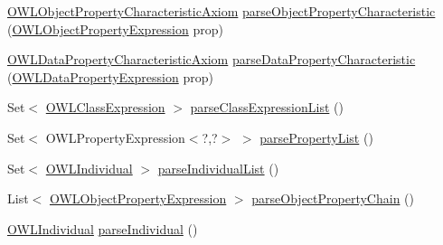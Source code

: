 \begin{DoxyCompactItemize}
\item 
\hyperlink{interfaceorg_1_1semanticweb_1_1owlapi_1_1model_1_1_o_w_l_object_property_characteristic_axiom}{O\-W\-L\-Object\-Property\-Characteristic\-Axiom} \hyperlink{classorg_1_1coode_1_1owlapi_1_1manchesterowlsyntax_1_1_manchester_o_w_l_syntax_editor_parser_aea12f7854e8d085858613f5f21e0d02e}{parse\-Object\-Property\-Characteristic} (\hyperlink{interfaceorg_1_1semanticweb_1_1owlapi_1_1model_1_1_o_w_l_object_property_expression}{O\-W\-L\-Object\-Property\-Expression} prop)
\item 
\hyperlink{interfaceorg_1_1semanticweb_1_1owlapi_1_1model_1_1_o_w_l_data_property_characteristic_axiom}{O\-W\-L\-Data\-Property\-Characteristic\-Axiom} \hyperlink{classorg_1_1coode_1_1owlapi_1_1manchesterowlsyntax_1_1_manchester_o_w_l_syntax_editor_parser_a18fb0d0cf1bfbc177dda26dbafe4a248}{parse\-Data\-Property\-Characteristic} (\hyperlink{interfaceorg_1_1semanticweb_1_1owlapi_1_1model_1_1_o_w_l_data_property_expression}{O\-W\-L\-Data\-Property\-Expression} prop)
\item 
Set$<$ \hyperlink{interfaceorg_1_1semanticweb_1_1owlapi_1_1model_1_1_o_w_l_class_expression}{O\-W\-L\-Class\-Expression} $>$ \hyperlink{classorg_1_1coode_1_1owlapi_1_1manchesterowlsyntax_1_1_manchester_o_w_l_syntax_editor_parser_af0fd0035ab52b1ce098ae281cb5e194c}{parse\-Class\-Expression\-List} ()
\item 
Set$<$ O\-W\-L\-Property\-Expression$<$?,?$>$ $>$ \hyperlink{classorg_1_1coode_1_1owlapi_1_1manchesterowlsyntax_1_1_manchester_o_w_l_syntax_editor_parser_a3fa44e6a618b6629455c50f599538f08}{parse\-Property\-List} ()
\item 
Set$<$ \hyperlink{interfaceorg_1_1semanticweb_1_1owlapi_1_1model_1_1_o_w_l_individual}{O\-W\-L\-Individual} $>$ \hyperlink{classorg_1_1coode_1_1owlapi_1_1manchesterowlsyntax_1_1_manchester_o_w_l_syntax_editor_parser_af827c741d860441c74b20edc44b8f8bb}{parse\-Individual\-List} ()
\item 
List$<$ \hyperlink{interfaceorg_1_1semanticweb_1_1owlapi_1_1model_1_1_o_w_l_object_property_expression}{O\-W\-L\-Object\-Property\-Expression} $>$ \hyperlink{classorg_1_1coode_1_1owlapi_1_1manchesterowlsyntax_1_1_manchester_o_w_l_syntax_editor_parser_ae48b15769ec12f2def6a1013d980d421}{parse\-Object\-Property\-Chain} ()
\item 
\hyperlink{interfaceorg_1_1semanticweb_1_1owlapi_1_1model_1_1_o_w_l_individual}{O\-W\-L\-Individual} \hyperlink{classorg_1_1coode_1_1owlapi_1_1manchesterowlsyntax_1_1_manchester_o_w_l_syntax_editor_parser_a2bd0af28c7a061f077f0d499b5ef4525}{parse\-Individual} ()

\end{DoxyCompactItemize}
